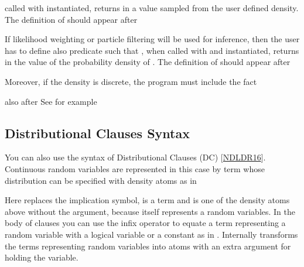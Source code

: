 \documentclass[letterpaper,10pt,english]{sphinxmanual}
\begin{document}
\sphinxAtStartPar
called with  instantiated, returns in  a value sampled from the user defined density.
The definition of  should appear after 

\sphinxAtStartPar
If likelihood weighting or particle filtering will be used for inference, then the user has to define also predicate  such that , when called with  and  instantiated, returns in  the value of the probability density of . The definition of  should appear after 

\sphinxAtStartPar
Moreover, if the density is discrete, the program must include the fact

\begin{sphinxVerbatim}[commandchars=\\\{\}]
\end{sphinxVerbatim}

\sphinxAtStartPar
also after 
See for example 


\subsection{Distributional Clauses Syntax}
\label{\detokenize{index:distributional-clauses-syntax}}
\sphinxAtStartPar
You can also use the syntax of Distributional Clauses (DC) {[}\hyperlink{cite.index:id49}{NDLDR16}{]}.
Continuous random variables are represented in this case by term whose distribution can be specified with density atoms as in

\begin{sphinxVerbatim}[commandchars=\\\{\}]
  
\end{sphinxVerbatim}

\sphinxAtStartPar
Here \sphinxcode{\sphinxupquote{:=}} replaces the implication symbol,  is a term and  is one of the density atoms above without the  argument, because  itself represents a random variables.
In the body of clauses you can use the infix operator \sphinxcode{\sphinxupquote{\textasciitilde{}=}} to equate a term representing a random variable with a logical variable or a constant as in .
Internally  transforms the terms representing random variables into atoms with an extra argument for holding the variable.
\end{document}
